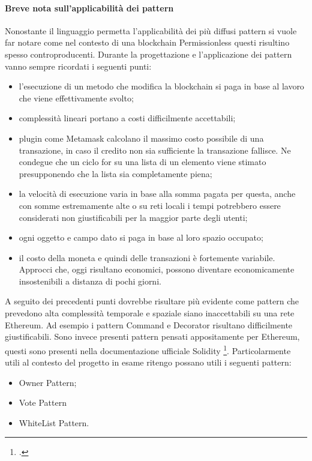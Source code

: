 \paragraph{Breve nota sull'applicabilità dei pattern}
Nonostante il linguaggio permetta l’applicabilità dei più diffusi pattern si vuole far notare come nel contesto di una blockchain Permissionless questi risultino spesso controproducenti. 
Durante la progettazione e l’applicazione dei pattern vanno sempre ricordati i seguenti punti:
\begin{itemize}
    \item l’esecuzione di un metodo che modifica la blockchain si paga in base al lavoro che viene effettivamente svolto;
    \item complessità lineari portano a costi difficilmente accettabili;
    \item plugin come Metamask calcolano il massimo costo possibile di una transazione, in caso il credito non sia sufficiente la transazione fallisce. Ne condegue che un ciclo for su una lista di un elemento viene stimato presupponendo che la lista sia completamente piena;
    \item la velocità di esecuzione varia in base alla somma pagata per questa, anche con somme estremamente alte o su reti locali i tempi potrebbero essere considerati non giustificabili per la maggior parte degli utenti;
    \item ogni oggetto e campo dato si paga in base al loro spazio occupato;
    \item il costo della moneta e quindi delle transazioni è fortemente variabile. Approcci che, oggi risultano economici, possono diventare economicamente insostenibili a distanza di pochi giorni.
\end{itemize}
A seguito dei precedenti punti dovrebbe risultare più evidente come pattern che prevedono alta complessità temporale e spaziale siano inaccettabili su una rete Ethereum. Ad esempio i pattern Command e Decorator risultano difficilmente giustificabili.
Sono invece presenti pattern pensati appositamente per Ethereum, questi sono presenti nella documentazione ufficiale Solidity \footcite{site:solidity-documentation}. Particolarmente utili al contesto del progetto in esame ritengo possano utili i seguenti pattern: 
\begin{itemize}
    \item Owner Pattern;
    \item Vote Pattern 
    \item WhiteList Pattern.
\end{itemize}

